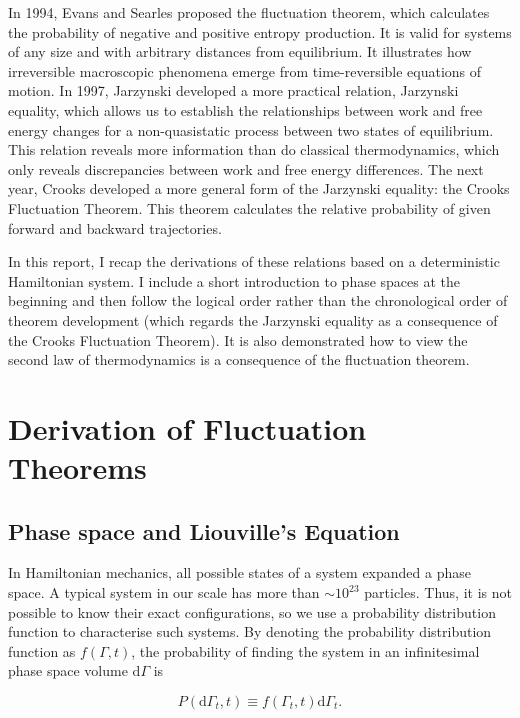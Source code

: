 \documentclass[ reprint, amsmath,amssymb, aps,]{revtex4-1}
\begin{document}
In 1994, Evans and Searles\cite{evans1994equilibrium} proposed the fluctuation theorem, which calculates the probability of negative and positive entropy production. It is valid for systems of any size and with arbitrary distances from equilibrium. It illustrates how irreversible macroscopic phenomena emerge from time-reversible equations of motion. In 1997, Jarzynski\cite{Jarzynski1997} developed a more practical relation, Jarzynski equality, which allows us to establish the relationships between work and free energy changes for a non-quasistatic process between two states of equilibrium. This relation reveals more information than do classical thermodynamics, which only reveals discrepancies between work and free energy differences.
The next year, Crooks\cite{crooks1998nonequilibrium} developed a more general form of the Jarzynski equality: the Crooks Fluctuation Theorem. This theorem calculates the relative probability of given forward and backward trajectories.


In this report, I recap the derivations of these relations based on a deterministic Hamiltonian system. I include a short introduction to phase spaces at the beginning and then follow the logical order rather than the chronological order of theorem development (which regards the Jarzynski equality as a consequence of the Crooks Fluctuation Theorem). It is also demonstrated how to view the second law of thermodynamics is a consequence of the fluctuation theorem. 

\section{Derivation of Fluctuation Theorems}

\subsection{Phase space and Liouville's Equation}
In Hamiltonian mechanics, all possible states of a system expanded a phase space. A typical system in our scale has more than $\sim 10^{23}$ particles. Thus, it is not possible to know their exact configurations, so we use a probability distribution function to characterise such systems. By denoting the probability distribution function as $f(\Gamma,t)$, the probability of finding the system in an infinitesimal phase space volume $\mathrm{d}\Gamma$ is 

\begin{equation}
P(\mathrm{d}\Gamma_t,t)\equiv 
f(\Gamma_t,t)\mathrm{d}\Gamma_t.
\end{equation}
\end{document}
